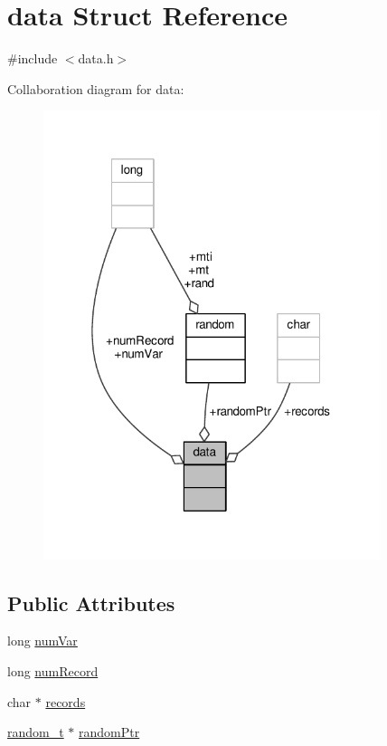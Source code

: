 \hypertarget{structdata}{\section{data Struct Reference}
\label{structdata}
}


{\ttfamily \#include $<$data.\-h$>$}



Collaboration diagram for data\-:
\nopagebreak
\begin{figure}[H]
\begin{center}
\leavevmode
\includegraphics[width=279pt]{structdata__coll__graph}
\end{center}
\end{figure}
\subsection*{Public Attributes}
\begin{DoxyCompactItemize}
\item 
long \hyperlink{structdata_a57c490bd4c1c55b80471b188b63eb050}{num\-Var}
\item 
long \hyperlink{structdata_a86f02f547af117233c320481fa6af765}{num\-Record}
\item 
char $\ast$ \hyperlink{structdata_ae9db45965c9bae02b2320fadefc800c6}{records}
\item 
\hyperlink{rstm_2rstm-dev_2stamp-0_89_810_2lib_2random_8h_af410e652a1bc8f802b0da971e8b87fad}{random\-\_\-t} $\ast$ \hyperlink{structdata_a39ede05c57971b7737f6e7fc700c5493}{random\-Ptr}
\end{DoxyCompactItemize}


